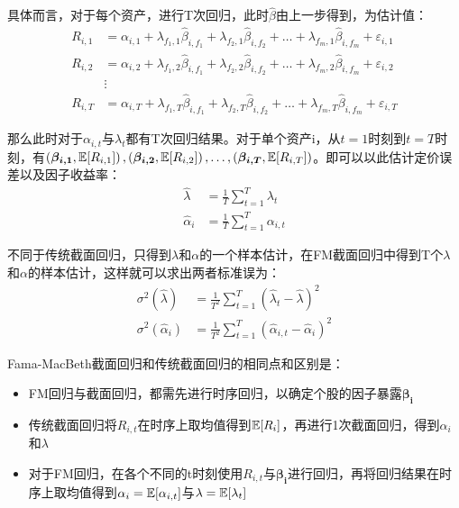 \documentclass[11pt]{article}
\begin{document}
具体而言，对于每个资产，进行T次回归，此时$\hat{\beta}$由上一步得到，为估计值：
\begin{align*}
    R_{i,1} &= \alpha_{i,1} + \lambda_{f_1,1} \hat{\beta}_{i,f_1} + \lambda_{f_2,1}\hat{\beta}_{i,f_2} + \dots + \lambda_{f_m,1} \hat{\beta}_{i,f_m} + \varepsilon_{i,1} \\
    R_{i,2} &= \alpha_{i,2} + \lambda_{f_1,2} \hat{\beta}_{i,f_1} + \lambda_{f_2,2}\hat{\beta}_{i,f_2} + \dots + \lambda_{f_m,2} \hat{\beta}_{i,f_m} + \varepsilon_{i,2} \\
    &\vdots \\
    R_{i,T} &= \alpha_{i,T} + \lambda_{f_1,T} \hat{\beta}_{i,f_1} + \lambda_{f_2,T}\hat{\beta}_{i,f_2} + \dots + \lambda_{f_m,T} \hat{\beta}_{i,f_m} + \varepsilon_{i,T}
\end{align*}


那么此时对于$\alpha_{i,t}$与$\lambda_t$都有T次回归结果。对于单个资产i，从$t=1$时刻到$t=T$时刻，有$\left(\bm{\beta_{i,1}},\mathbb{E}[R_{i,1}]\right),\left(\bm{\beta_{i,2}},\mathbb{E}[R_{i,2}]\right),\dots,\left(\bm{\beta_{i,T}},\mathbb{E}[R_{i,T}]\right)$。即可以以此估计定价误差以及因子收益率：
\begin{align*}
    \hat{\lambda} &= \frac{1}{T} \sum_{t=1}^{T} \lambda_t \\
    \hat{\alpha}_i &= \frac{1}{T} \sum_{t=1}^{T} \alpha_{i,t}
\end{align*}

不同于传统截面回归，只得到$\lambda$和$\alpha$的一个样本估计，在FM截面回归中得到T个$\lambda$和$\alpha$的样本估计，这样就可以求出两者标准误为：
\begin{align*}
    \sigma^2(\hat{\lambda}) &= \frac{1}{T^2} \sum_{t=1}^{T} \left( \hat{\lambda}_t - \hat{\lambda} \right)^2 \\
    \sigma^2(\hat{\alpha}_i) &= \frac{1}{T^2} \sum_{t=1}^{T} \left( \hat{\alpha}_{i,t} - \hat{\alpha}_i \right)^2
\end{align*}

Fama-MacBeth截面回归和传统截面回归的相同点和区别是：
\begin{itemize}
    \item FM回归与截面回归，都需先进行时序回归，以确定个股的因子暴露$\bm{\beta_i}$
    \item 传统截面回归将$R_{i,t}$在时序上取均值得到$\mathbb{E}[R_i]$，再进行1次截面回归，得到$\alpha_i$和$\lambda$
    \item 对于FM回归，在各个不同的t时刻使用$R_{i,t}$与$\bm{\beta_{i}}$进行回归，再将回归结果在时序上取均值得到$\alpha_i = \mathbb{E}[\alpha_{i,t}]$与$\lambda=\mathbb{E}[\lambda_t]$
\end{itemize}
\end{document}
